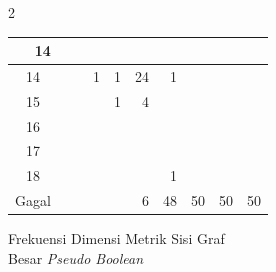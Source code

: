 \documentclass[12pt]{article}
\newcommand{\foreign}[1]{\textit{#1}}
\begin{document}
{\begin{multicols}{2}
{\begin{tabular}{|c|lllllllll|}
\multicolumn{1}{r|}{14} & \multicolumn{1}{r|}{} & \multicolumn{1}{r|}{} & \multicolumn{1}{r|}{} & \\ \hline 14 & \multicolumn{1}{r|}{} & \multicolumn{1}{r|}{} & \multicolumn{1}{r|}{1} & \multicolumn{1}{r|}{1} & \multicolumn{1}{r|}{24} & \multicolumn{1}{r|}{1} & \multicolumn{1}{r|}{} & \multicolumn{1}{r|}{} & \\ \hline 15 & \multicolumn{1}{r|}{} & \multicolumn{1}{r|}{} & \multicolumn{1}{r|}{} & \multicolumn{1}{r|}{1} & \multicolumn{1}{r|}{4} & \multicolumn{1}{r|}{} & \multicolumn{1}{r|}{} & \multicolumn{1}{r|}{} & \\ \hline 16 & \multicolumn{1}{r|}{} & \multicolumn{1}{r|}{} & \multicolumn{1}{r|}{} & \multicolumn{1}{r|}{} & \multicolumn{1}{r|}{} & \multicolumn{1}{r|}{} & \multicolumn{1}{r|}{} & \multicolumn{1}{r|}{} & \\ \hline 17 & \multicolumn{1}{r|}{} & \multicolumn{1}{r|}{} & \multicolumn{1}{r|}{} & \multicolumn{1}{r|}{} & \multicolumn{1}{r|}{} & \multicolumn{1}{r|}{} & \multicolumn{1}{r|}{} & \multicolumn{1}{r|}{} & \\ \hline 18 & \multicolumn{1}{r|}{} & \multicolumn{1}{r|}{} & \multicolumn{1}{r|}{} & \multicolumn{1}{r|}{} & \multicolumn{1}{r|}{} & \multicolumn{1}{r|}{1} & \multicolumn{1}{r|}{} & \multicolumn{1}{r|}{} & \\ \hline Gagal & \multicolumn{1}{r|}{} & \multicolumn{1}{r|}{} & \multicolumn{1}{r|}{} & \multicolumn{1}{r|}{} & \multicolumn{1}{r|}{6} & \multicolumn{1}{r|}{48} & \multicolumn{1}{r|}{50} & \multicolumn{1}{r|}{50} & 50 \\ \hline
		\end{tabular}
	}

	Frekuensi Dimensi Metrik Sisi Graf\\ Besar \foreign{Pseudo Boolean}


\end{multicols}}
\end{document}
